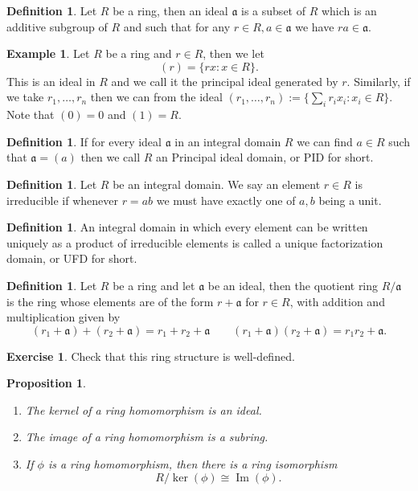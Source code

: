 \documentclass[11pt,a4paper]{report}
\theoremstyle{plain}
\newtheorem{prop}[subsection]{Proposition}
\theoremstyle{definition}
\newtheorem{definition}[subsection]{Definition}
\newtheorem{exmp}[subsection]{Example}
\theoremstyle{definition}
\newtheorem{question}[subsection]{Exercise}
\def\gotha{\mathfrak{a}}
\DeclareMathOperator{\im}{Im}
\begin{document}
	\begin{definition}
		Let $R$ be a ring, then an ideal $\gotha$ is a subset of $R$ which is an additive subgroup of $R$ and such that for any $r \in R, a \in \gotha$ we have $ra \in \gotha$.
	\end{definition}
	\begin{exmp}
		Let $R$ be a ring and $r \in R$, then we let \[(r)=\{rx : x \in R\}.\] This is an ideal in $R$ and we call it the principal ideal generated by $r$. Similarly, if we take $r_1,\dots,r_n$ then we can from the ideal $(r_1,\dots,r_n):=\{\sum_i r_i x_i : x_i \in R\}$. Note that $(0)=0$ and $(1)=R$.
	\end{exmp}
	
	\begin{definition}
		If for every ideal $\gotha$ in an integral domain $R$ we can find $a \in R$ such that $\gotha=(a)$ then we call $R$ an Principal ideal domain, or PID for short.
	\end{definition}
	
	\begin{definition}\label{definition: irr elt}
		Let $R$ be an integral domain. We say an element $r \in R$ is irreducible if whenever $r=ab$ we must have exactly one of $a,b$ being a unit.
	\end{definition}
	
	\begin{definition}
		An integral domain in which every element can be written uniquely as a product of irreducible elements is called a unique factorization domain, or UFD for short.
	\end{definition}
	\begin{definition}
		Let $R$ be a ring and let $\gotha$ be an ideal, then the quotient ring $R/\gotha$ is the ring whose elements are of the form $r+\gotha$ for $r \in R$, with addition and multiplication given by \[(r_1+ \gotha) + (r_2+\gotha)=r_1+r_2 + \gotha \qquad (r_1+\gotha)(r_2+\gotha)=r_1r_2 + \gotha. \]
	\end{definition}
	\begin{question}
		Check that this ring structure is well-defined.
	\end{question}
	
	\begin{prop}\label{prop: ques about rings}
		\begin{enumerate}
			\item The kernel of a ring homomorphism is an ideal.
			\item The image of a ring homomorphism is a subring.
			\item If $\phi$  is a ring homomorphism, then there is a ring isomorphism \[R / \ker(\phi) \cong \im(\phi).\]
		\end{enumerate}
	\end{prop}
	
\end{document}
